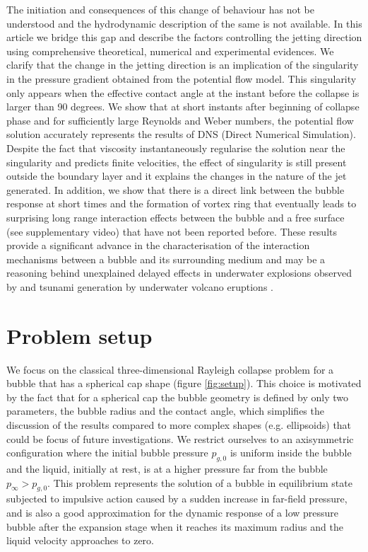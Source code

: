 \documentclass[final]{jfm}
\begin{document}
The initiation and consequences of this change of behaviour has not be understood and the hydrodynamic description of the same is not available.
In this article we bridge this gap and describe the factors controlling the jetting direction using comprehensive theoretical, numerical and experimental evidences. We clarify that the change in the jetting direction is an implication of the singularity in the pressure gradient obtained from the potential flow model. This singularity only appears when the effective contact angle at the instant before the collapse is larger than 90 degrees. We show that at short instants after beginning of collapse phase and for sufficiently large Reynolds and Weber numbers, the potential flow solution accurately represents the results of DNS (Direct Numerical Simulation). Despite the fact that viscosity instantaneously regularise the solution near the singularity and predicts finite velocities, the effect of singularity is still present outside the boundary layer and it explains the changes in the nature of the jet generated. In addition, we show that there is a direct link between the bubble response at short times and the formation of vortex ring that eventually leads to surprising long range interaction effects between the bubble and a free surface (see supplementary video) that have not been reported before. These results provide a significant advance in the characterisation of the interaction mechanisms between a bubble and its surrounding medium and may be a reasoning behind unexplained delayed effects in underwater explosions observed by \citet{kedrinskii1978surface} and tsunami generation by underwater volcano eruptions \citep{paris2015source}.

\section{Problem setup}
We focus on the classical three-dimensional Rayleigh collapse problem for a bubble that has a spherical cap shape (figure \ref{fig:setup}). 
This choice is motivated by the fact that for a spherical cap the bubble geometry is defined by only two parameters, the bubble radius and the contact angle, which simplifies the discussion of the results compared to more complex shapes (e.g. ellipsoids) that could be focus of future investigations.
We restrict ourselves to an axisymmetric configuration where the initial bubble pressure $p_{g,0}$ is uniform inside the bubble and the liquid, initially at rest, is at a higher pressure far from the bubble $p_\infty > p_{g,0}$. This problem represents the solution of a bubble in equilibrium state subjected to impulsive action caused by a sudden increase in far-field pressure, and is also a good approximation for the dynamic response of a low pressure bubble after the expansion stage when it reaches its maximum radius and the liquid velocity approaches to zero.\\
\end{document}

